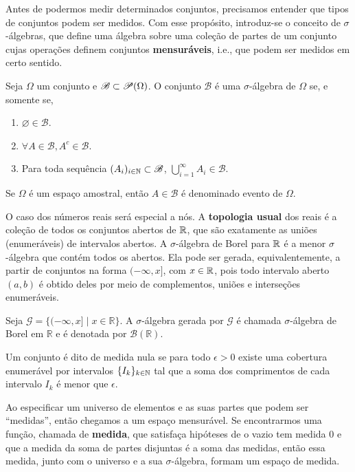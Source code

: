 Antes de podermos medir determinados conjuntos, precisamos entender que tipos de
conjuntos podem ser medidos.
Com esse propósito, introduz-se o conceito de $\sigma$-álgebras, que define uma álgebra
sobre uma coleção de partes de um conjunto cujas operações definem conjuntos
\textbf{mensuráveis}, i.e., que podem ser medidos em certo sentido.

\begin{def:sigma algebra}
Seja $\Omega$ um conjunto e $\mathcal{B} \subset \mathcal{P}\!\left(\Omega\right)$.
O conjunto $\mathcal{B}$ é uma $\sigma$-álgebra de $\Omega$ se, e somente se,
\begin{enumerate}
	\item[i] $\varnothing \in \mathcal{B}$.
	\item[ii] $\forall A \in \mathcal{B}, A^c \in \mathcal{B}$.
	\item[iii] Para toda sequência $(A_i)_{i \in \mathbb{N}} \subset \mathcal{B}$,
	      $\bigcup_{i=1}^\infty A_i \in \mathcal{B}$.
\end{enumerate}
Se $\Omega$ é um espaço amostral, então $A \in \mathcal{B}$ é denominado evento de
$\Omega$.
\end{def:sigma algebra}

O caso dos números reais será especial a nós.
A \textbf{topologia usual} dos reais é a coleção de todos os conjuntos abertos de $\mathbb{R}$,
que são exatamente as uniões (enumeráveis) de intervalos abertos.
A $\sigma$-álgebra de Borel para $\mathbb{R}$ é a menor $\sigma$-álgebra que contém todos os
abertos. Ela pode ser gerada, equivalentemente, a partir de conjuntos na forma
$(-\infty, x]$, com $x \in \mathbb{R}$, pois todo intervalo aberto $(a, b)$ é obtido deles
por meio de complementos, uniões e interseções enumeráveis.

\begin{def:borel}
Seja \(\mathcal{G} = \{(-\infty, x] \mid x \in \mathbb{R}\}\). A $\sigma$-álgebra gerada por
\(\mathcal{G}\) é chamada $\sigma$-álgebra de Borel em \(\mathbb{R}\) e é denotada por
\(\mathcal{B}(\mathbb{R})\).
\end{def:borel}

\begin{def:medida nula}
Um conjunto é dito de medida nula se para todo $\epsilon > 0$ existe uma cobertura
enumerável por intervalos $\{I_k\}_{k \in \mathbb{N}}$ tal que a soma dos comprimentos de cada intervalo $I_k$ é
menor que $\epsilon$.
\end{def:medida nula}

Ao especificar um universo de elementos e as suas partes que podem ser ``medidas'',
então chegamos a um espaço mensurável.
Se encontrarmos uma função, chamada de \textbf{medida}, que satisfaça hipóteses de
o vazio tem medida $0$ e que a medida da soma de partes disjuntas é a soma das medidas,
então essa medida, junto com o universo e a sua $\sigma$-álgebra, formam um espaço de
medida.

